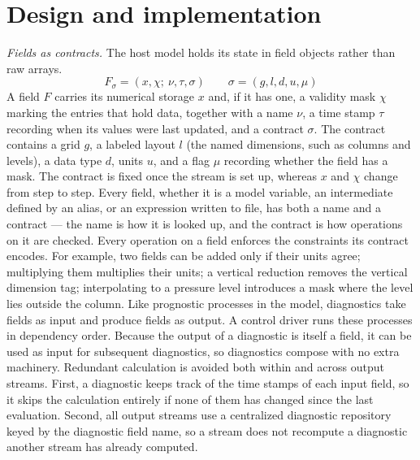 \documentclass[gmd, manuscript]{copernicus}
\begin{document}
\section{Design and implementation}
\label{sec:design}

\emph{Fields as contracts.} The host model holds its state in field objects rather than raw arrays.
\begin{equation}
  F_\sigma = (x, \chi;\ \nu, \tau, \sigma)
  \qquad
  \sigma = (g,l,d,u,\mu)
  \label{eq:field}
\end{equation}
A field $F$ carries its numerical storage $x$ and, if it has one, a validity mask $\chi$ marking the entries that hold data, together with a name $\nu$, a time stamp $\tau$ recording when its values were last updated, and a contract $\sigma$. The contract contains a grid $g$, a labeled layout $l$ (the named dimensions, such as columns and levels), a data type $d$, units $u$, and a flag $\mu$ recording whether the field has a mask. The contract is fixed once the stream is set up, whereas $x$ and $\chi$ change from step to step. Every field, whether it is a model variable, an intermediate defined by an alias, or an expression written to file, has both a name and a contract --- the name is how it is looked up, and the contract is how operations on it are checked. Every operation on a field enforces the constraints its contract encodes. For example, two fields can be added only if their units agree; multiplying them multiplies their units; a vertical reduction removes the vertical dimension tag; interpolating to a pressure level introduces a mask where the level lies outside the column. Like prognostic processes in the model, diagnostics take fields as input and produce fields as output. A control driver runs these processes in dependency order. Because the output of a diagnostic is itself a field, it can be used as input for subsequent diagnostics, so diagnostics compose with no extra machinery. Redundant calculation is avoided both within and across output streams. First, a diagnostic keeps track of the time stamps of each input field, so it skips the calculation entirely if none of them has changed since the last evaluation. Second, all output streams use a centralized diagnostic repository keyed by the diagnostic field name, so a stream does not recompute a diagnostic another stream has already computed.
\end{document}
